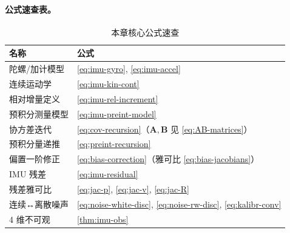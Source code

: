 \paragraph{公式速查表。}
\begin{table}[H]\centering\small
\caption{本章核心公式速查}
\begin{tabular}{ll}
\toprule
名称 & 公式 \\
\midrule
陀螺/加计模型 & \cref{eq:imu-gyro}, \cref{eq:imu-accel} \\
连续运动学 & \cref{eq:imu-kin-cont} \\
相对增量定义 & \cref{eq:imu-rel-increment} \\
预积分测量模型 & \cref{eq:imu-preint-model} \\
协方差迭代 & \cref{eq:cov-recursion}（$\mathbf A,\mathbf B$ 见 \cref{eq:AB-matrices}） \\
预积分量递推 & \cref{eq:preint-recursion} \\
偏置一阶修正 & \cref{eq:bias-correction}（雅可比 \cref{eq:bias-jacobians}） \\
IMU 残差 & \cref{eq:imu-residual} \\
残差雅可比 & \cref{eq:jac-p}, \cref{eq:jac-v}, \cref{eq:jac-R} \\
连续↔离散噪声 & \cref{eq:noise-white-disc}, \cref{eq:noise-rw-disc}, \cref{eq:kalibr-conv} \\
4 维不可观 & \cref{thm:imu-obs} \\
\bottomrule
\end{tabular}
\end{table}

